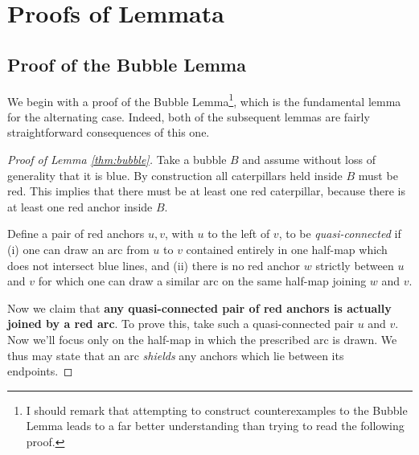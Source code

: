 \section{Proofs of Lemmata}
\label{sec:lemmata_proof}
\subsection{Proof of the Bubble Lemma}
We begin with a proof of the Bubble Lemma\footnote{I should remark that attempting to construct counterexamples to the Bubble Lemma leads to a far better understanding than trying to read the following proof.}, which is the fundamental lemma for the alternating case.  Indeed, both of the subsequent lemmas are fairly straightforward consequences of this one.  

\bubble*
\begin{proof}[Proof of Lemma \ref{thm:bubble}]
	Take a bubble $B$ and assume without loss of generality that it is blue.  By construction all caterpillars held inside $B$ must be red.  This implies that there must be at least one red caterpillar, because there is at least one red anchor inside $B$.

	Define a pair of red anchors $u, v$, with $u$ to the left of $v$, to be \emph{quasi-connected} if (i) one can draw an arc from $u$ to $v$ contained entirely in one half-map which does not intersect blue lines, and (ii) there is no red anchor $w$ strictly between $u$ and $v$ for which one can draw a similar arc on the same half-map joining $w$ and $v$.

	Now we claim that \textbf{any quasi-connected pair of red anchors is actually joined by a red arc}.  To prove this, take such a quasi-connected pair $u$ and $v$.  Now we'll focus only on the half-map in which the prescribed arc is drawn.  We thus may state that an arc \emph{shields} any anchors which lie between its endpoints.
	

\end{proof}
